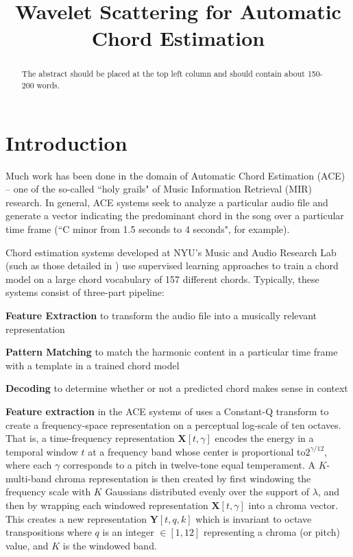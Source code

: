 \documentclass{article}
\title{Wavelet Scattering for Automatic Chord Estimation}
\begin{document}
%
\maketitle
%
\begin{abstract}
The abstract should be placed at the top left column and should contain about 150-200 words.
\end{abstract}


\section{Introduction}\label{sec:introduction}

Much work has been done in the domain of Automatic Chord Estimation (ACE) -- one of the so-called ``holy grails" of Music Information Retrieval (MIR) research. In general, ACE systems seek to analyze a particular audio file and generate a vector indicating the predominant chord in the song over a particular time frame (``C minor from 1.5 seconds to 4 seconds", for example). 
	
	Chord estimation systems developed at NYU's Music and Audio Research Lab (such as those detailed in \cite{cho2014on} \cite{humphrey2015four}) use supervised learning approaches to train a chord model on a large chord vocabulary of 157 different chords. Typically, these systems consist of three-part pipeline:
	\begin{description}
	\item{\textbf{Feature Extraction}} to transform the audio file into a musically relevant representation
	\item{\textbf{Pattern Matching}} to match the harmonic content in a particular time frame with a template in a trained chord model
	\item{\textbf{Decoding}} to determine whether or not a predicted chord makes sense in context
	\end{description}
	
\textbf{Feature extraction} in the ACE systems of \cite{cho2014on} \cite{chothesis} uses a
Constant-Q transform to create a frequency-space representation on a perceptual log-scale of ten octaves.
That is, a time-frequency representation $\boldsymbol{X}[t, \gamma]$ encodes the energy in
a temporal window $t$ at a frequency band whose center is proportional to$2^{\gamma/12}$,
where each $\gamma$ corresponds to a pitch in twelve-tone equal temperament.
A $K$-multi-band chroma representation is then created by first windowing the frequency
scale with $K$ Gaussians distributed evenly over the support of $\lambda$, and then by wrapping
each windowed representation $\boldsymbol{X}[t,\gamma]$ into a chroma vector.
This creates a new representation $\boldsymbol{Y}[t,q,k]$ which is invariant to octave transpositions
where $q$ is an integer $\in [1,12]$ representing a chroma (or pitch) value, and $K$ is the windowed band. 
\end{document}
